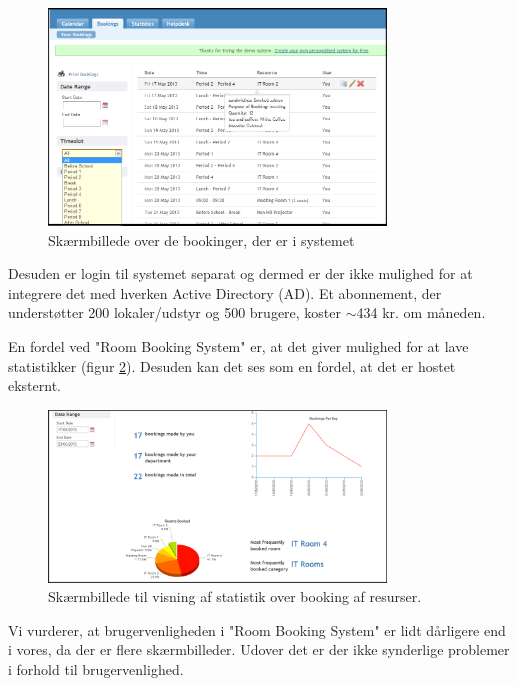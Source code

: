 \begin{figure}[h!]
  \centering
    \includegraphics[width=0.8\textwidth]{Appendix/GUI-Prototype/RoomBookingSystemList}
  \caption{Skærmbillede over de bookinger, der er i systemet}
\label{Comparison_RBS_RoomBookingSystemList}
\end{figure}

Desuden er login til systemet separat og dermed er der ikke mulighed for at integrere det med hverken Active Directory (AD). Et abonnement, der understøtter 200 lokaler/udstyr og 500 brugere, koster $\sim$434 kr. om måneden.

En fordel ved "Room Booking System" er, at det giver mulighed for at lave statistikker (figur \ref{Comparison_RBS_RoomBookingSystemStatistic}). Desuden kan det ses som en fordel, at det er hostet eksternt.

\begin{figure}[h!]
  \centering
    \includegraphics[width=0.8\textwidth]{Appendix/GUI-Prototype/RoomBookingSystemStatistic}
  \caption{Skærmbillede til visning af statistik over booking af resurser.}
\label{Comparison_RBS_RoomBookingSystemStatistic}
\end{figure}

Vi vurderer, at brugervenligheden i "Room Booking System" er lidt dårligere end i vores, da der er flere skærmbilleder. Udover det er der ikke synderlige problemer i forhold til brugervenlighed.


